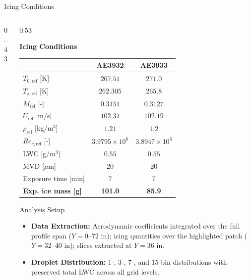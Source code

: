 \begin{frame}{\small Icing Conditions}
\begin{columns}[T,onlytextwidth]
\begin{column}{0.43\textwidth}
\end{column}

\begin{column}{0.53\textwidth}
\centering

\textbf{Icing Conditions} \\
\vspace{0.05cm}

\begin{tabular}{lcc}
\toprule
 & \textbf{AE3932} & \textbf{AE3933} \\
\midrule
$T_{0,\mathrm{ref}}$ [K]         & $267.51$ & $271.0$ \\
$T_{s,\mathrm{ref}}$ [K]         & $262.305$ & $265.8$ \\
$M_{\mathrm{ref}}$ [-]           & $0.3151$ & $0.3127$ \\
$U_{\mathrm{ref}}$ [m/s]         & $102.31$ & $102.19$ \\
$\rho_{\mathrm{ref}}$ [kg/m$^3$] & $1.21$ & $1.2$ \\
$Re_{c,\mathrm{ref}}$ [-]        & $3.9795\times10^6$ & $3.8947\times10^6$ \\
LWC [g/m$^3$]                     & $0.55$ & $0.55$ \\
MVD [$\mu$m]                      & $20$ & $20$ \\
Exposure time [min]               & $7$ & $7$ \\
\midrule
\textbf{Exp. ice mass [g]}        & \textbf{101.0} & \textbf{85.9} \\
\bottomrule
\end{tabular}


\vspace{-0.1cm}

\begin{block}{\scriptsize Analysis Setup}
\scriptsize

\begin{itemize}
    \item \textbf{Data Extraction:}
    Aerodynamic coefficients integrated over the full profile span ($Y=0$--$72$ in);
    icing quantities over the highlighted patch ($Y=32$--$40$ in); slices extracted at
    $Y=36$ in.

    \item \textbf{Droplet Distribution:}
    1-, 3-, 7-, and 15-bin distributions with preserved total LWC
    across all grid levels.
\end{itemize}

\end{block}

\end{column}
\end{columns}
\end{frame}

